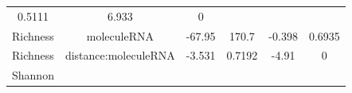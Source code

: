 \documentclass[]{article}
\begin{document}
\begin{longtable}[]{@{}cccccc@{}}
\begin{minipage}[t]{0.14\columnwidth}
0.5111\strut
\end{minipage} & \begin{minipage}[t]{0.12\columnwidth}\centering\strut
6.933\strut
\end{minipage} & \begin{minipage}[t]{0.09\columnwidth}\centering\strut
0\strut
\end{minipage}\tabularnewline
\begin{minipage}[t]{0.12\columnwidth}\centering\strut
Richness\strut
\end{minipage} & \begin{minipage}[t]{0.24\columnwidth}\centering\strut
moleculeRNA\strut
\end{minipage} & \begin{minipage}[t]{0.11\columnwidth}\centering\strut
-67.95\strut
\end{minipage} & \begin{minipage}[t]{0.14\columnwidth}\centering\strut
170.7\strut
\end{minipage} & \begin{minipage}[t]{0.12\columnwidth}\centering\strut
-0.398\strut
\end{minipage} & \begin{minipage}[t]{0.09\columnwidth}\centering\strut
0.6935\strut
\end{minipage}\tabularnewline
\begin{minipage}[t]{0.12\columnwidth}\centering\strut
Richness\strut
\end{minipage} & \begin{minipage}[t]{0.24\columnwidth}\centering\strut
distance:moleculeRNA\strut
\end{minipage} & \begin{minipage}[t]{0.11\columnwidth}\centering\strut
-3.531\strut
\end{minipage} & \begin{minipage}[t]{0.14\columnwidth}\centering\strut
0.7192\strut
\end{minipage} & \begin{minipage}[t]{0.12\columnwidth}\centering\strut
-4.91\strut
\end{minipage} & \begin{minipage}[t]{0.09\columnwidth}\centering\strut
0\strut
\end{minipage}\tabularnewline
\begin{minipage}[t]{0.12\columnwidth}\centering\strut
Shannon\strut
\end{minipage} & \begin{minipage}[t]{0.24\columnwidth}\centering\strut

\end{minipage}
\end{longtable}
\end{document}
